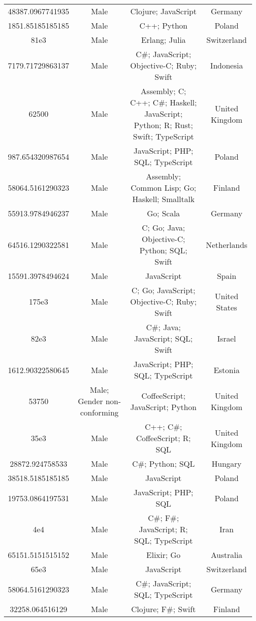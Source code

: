 \begin{center}
\begin{tabular}{ |c|c|c|c| }
48387.0967741935  &  Male  &  Clojure; JavaScript  &  Germany  \\ 
1851.85185185185  &  Male  &  C++; Python  &  Poland  \\ 
81e3  &  Male  &  Erlang; Julia  &  Switzerland  \\ 
7179.71729863137  &  Male  &  C\#; JavaScript; Objective-C; Ruby; Swift  &  Indonesia  \\ 
62500  &  Male  &  Assembly; C; C++; C\#; Haskell; JavaScript; Python; R; Rust; Swift; TypeScript  &  United Kingdom  \\ 
987.654320987654  &  Male  &  JavaScript; PHP; SQL; TypeScript  &  Poland  \\ 
58064.5161290323  &  Male  &  Assembly; Common Lisp; Go; Haskell; Smalltalk  &  Finland  \\ 
55913.9784946237  &  Male  &  Go; Scala  &  Germany  \\ 
64516.1290322581  &  Male  &  C; Go; Java; Objective-C; Python; SQL; Swift  &  Netherlands  \\ 
15591.3978494624  &  Male  &  JavaScript  &  Spain  \\ 
175e3  &  Male  &  C; Go; JavaScript; Objective-C; Ruby; Swift  &  United States  \\ 
82e3  &  Male  &  C\#; Java; JavaScript; SQL; Swift  &  Israel  \\ 
1612.90322580645  &  Male  &  JavaScript; PHP; SQL; TypeScript  &  Estonia  \\ 
53750  &  Male; Gender non-conforming  &  CoffeeScript; JavaScript; Python  &  United Kingdom  \\ 
35e3  &  Male  &  C++; C\#; CoffeeScript; R; SQL  &  United Kingdom  \\ 
28872.924758533  &  Male  &  C\#; Python; SQL  &  Hungary  \\ 
38518.5185185185  &  Male  &  JavaScript  &  Poland  \\ 
19753.0864197531  &  Male  &  JavaScript; PHP; SQL  &  Poland  \\ 
4e4  &  Male  &  C\#; F\#; JavaScript; R; SQL; TypeScript  &  Iran  \\ 
65151.5151515152  &  Male  &  Elixir; Go  &  Australia  \\ 
65e3  &  Male  &  JavaScript  &  Switzerland  \\ 
58064.5161290323  &  Male  &  C\#; JavaScript; SQL; TypeScript  &  Germany  \\ 
32258.064516129  &  Male  &  Clojure; F\#; Swift  &  Finland  \\ 

\end{tabular}
\end{center}
